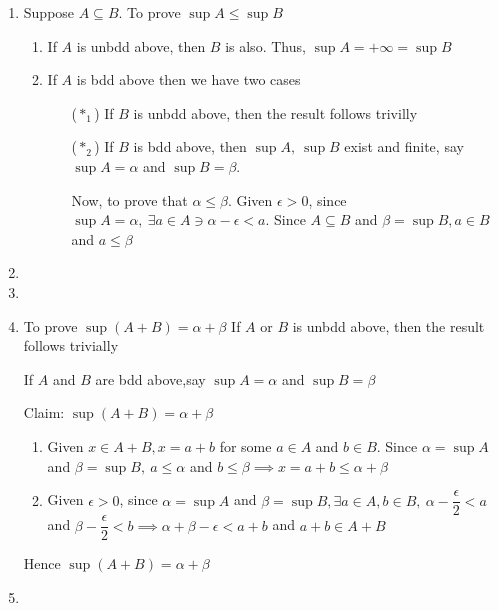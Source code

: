 \begin{tcolorbox}
	\begin{solution}$ $
		\begin{enumerate}[wide]
			\item Suppose $A \subseteq B$. To prove $\sup A \leq \sup B$
			\begin{enumerate}[label = $(*)$]
				\item If $A$ is unbdd above, then $B$ is also. Thus, $\sup A = + \infty = \sup B$
				\item If $A$ is bdd above then we have two cases
					\begin{enumerate}
						\item[($*_1$)] If $B$ is unbdd above, then the result follows trivilly
						\item[($*_2$)] If $B$ is bdd above, then $\sup A,~\sup B$ exist and finite, say $\sup A = \alpha$ and $\sup B = \beta$.
						
						Now, to prove that $\alpha \leq \beta$. Given $\epsilon > 0$, since $\sup A = \alpha,~\exists a \in A \ni \alpha - \epsilon < a$. Since $A \subseteq B$ and $\beta = \sup B, a \in B$ and $a \leq \beta$
					\end{enumerate}
			\end{enumerate}
			\item 
			\item 
			\item To prove $\sup (A+B) = \alpha + \beta$ If $A$ or $B$ is unbdd above, then the result follows trivially
			
			If $A$ and $B$ are bdd above,say $\sup A = \alpha$ and $\sup B = \beta$
			
			Claim: $\sup (A+B) = \alpha + \beta$
			\begin{enumerate}
				\item Given $x \in A + B, x = a+b$ for some $a \in A$ and $b \in B$. Since $\alpha = \sup A$ and $\beta = \sup B,~ a \leq \alpha $ and $b \leq \beta \implies x = a+b \leq \alpha + \beta$
				\item Given $\epsilon > 0$, since $\alpha = \sup A$ and $\beta = \sup B, \exists a \in A,b \in B,~ \alpha - \dfrac{\epsilon}{2} < a$ and $\beta - \dfrac{\epsilon}{2} < b \implies \alpha + \beta - \epsilon < a+b$ and $a + b \in A + B$
 			\end{enumerate}
 			Hence $\sup (A+B) = \alpha + \beta$
			\item
		\end{enumerate}
	\end{solution}
\end{tcolorbox}